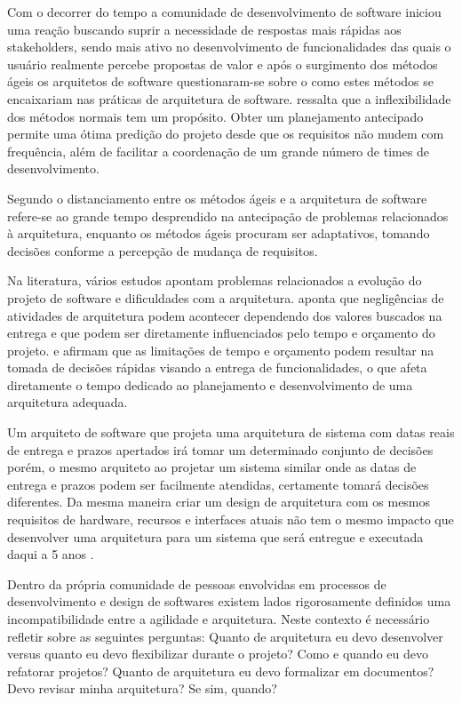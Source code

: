 
Com o decorrer do tempo a comunidade de desenvolvimento de software iniciou uma reação buscando suprir a necessidade de respostas mais rápidas aos stakeholders, sendo mais ativo no desenvolvimento de funcionalidades das quais o usuário realmente percebe propostas de valor e após o surgimento dos métodos ágeis os arquitetos de software questionaram-se sobre o como estes métodos se encaixariam nas práticas de arquitetura de software. \cite{babar2013agile} ressalta que a inflexibilidade dos métodos normais tem um propósito. Obter um planejamento antecipado permite uma ótima predição do projeto desde que os requisitos não mudem com frequência, além de facilitar a coordenação de um grande número de times de desenvolvimento.


Segundo \cite{abrahamsson2010agility} o distanciamento entre os métodos ágeis e a arquitetura de software refere-se ao grande tempo desprendido na antecipação de problemas relacionados à arquitetura, enquanto os métodos ágeis procuram ser adaptativos, tomando decisões conforme a percepção de mudança de requisitos. 

Na literatura, vários estudos apontam problemas relacionados a evolução do projeto de software e dificuldades com a arquitetura. \cite{waterman2015much} aponta que negligências de atividades de arquitetura podem acontecer dependendo dos valores buscados na entrega e que podem ser diretamente influenciados pelo tempo e orçamento do projeto. \cite{martini2015investigating} e \cite{bellomo2013study} afirmam que as limitações de tempo e orçamento podem resultar na tomada de decisões rápidas visando a entrega de funcionalidades, o que afeta diretamente o tempo dedicado ao planejamento e desenvolvimento de uma arquitetura adequada.

Um arquiteto de software que projeta uma arquitetura de sistema com datas reais de entrega e prazos apertados irá tomar um determinado conjunto de decisões porém, o mesmo arquiteto ao projetar um sistema similar onde as datas de entrega e prazos podem ser facilmente atendidas, certamente tomará decisões diferentes. Da mesma maneira criar um design de arquitetura com os mesmos requisitos de hardware, recursos e interfaces atuais não tem o mesmo impacto que desenvolver uma arquitetura para um sistema que será entregue e executada daqui a 5 anos \cite{bass2007software}.

Dentro da própria comunidade de pessoas envolvidas em processos de desenvolvimento e design de softwares existem lados rigorosamente definidos  uma incompatibilidade entre a agilidade e arquitetura. Neste contexto é necessário refletir sobre as seguintes perguntas: Quanto de arquitetura eu devo desenvolver versus quanto eu devo flexibilizar durante o projeto? Como e quando eu devo refatorar projetos? Quanto de arquitetura eu devo formalizar em documentos? Devo revisar minha arquitetura? Se sim, quando?
\cite{babar2013agile}

